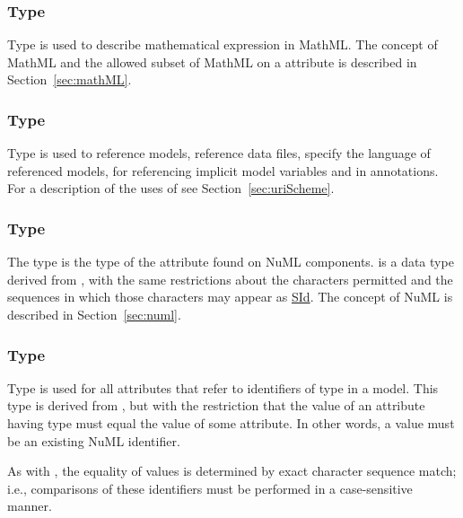 \subsubsection[\element{MathML}]{Type }
\label{type:mathml}
Type  is used to describe mathematical expression in MathML. The concept of MathML and the allowed subset of MathML on a  attribute is described in Section~\ref{sec:mathML}.

\subsubsection[\element{anyURI}]{Type }
\label{type:anyURI}
Type  is used to reference models, reference data files, specify the language of referenced models, for referencing implicit model variables and in annotations. For a description of the uses of  see Section~\ref{sec:uriScheme}.

\subsubsection[\element{NuMLSId}]{Type }
\label{type:numlsid}
The type  is the type of the  attribute found on NuML components.  is a data type derived from , with the same restrictions about the characters permitted and the sequences in which those characters may appear as \hyperref[type:sid]{SId}. The concept of NuML is described in Section~\ref{sec:numl}.

\subsubsection[\element{NuMLSIdRef}]{Type }
\label{type:numlsidref}
Type  is used for all attributes that refer to identifiers of type \hyperref[type:numlsid]{} in a model. This type is derived from \hyperref[type:numlsid]{}, but with the restriction that the value of an attribute having type  must equal the value of some \hyperref[type:numlsid]{} attribute. In other words, a  value must be an existing NuML identifier.

As with \hyperref[type:numlsid]{}, the equality of  values is determined by exact character sequence match; i.e., comparisons of these identifiers must be performed in a case-sensitive manner.


